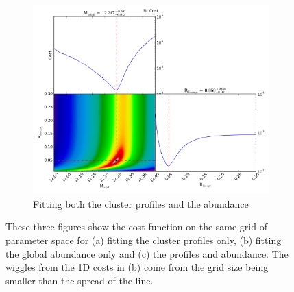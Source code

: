 \documentclass[twocolumn]{article}
\begin{document}
\begin{figure}
  \begin{subfigure}{.5\textwidth}
    \centering\includegraphics[width=1.0\linewidth]{figs/cfn/simet/simet_rd_abundance.param/calc_likelihood_bounds.py/fig2.png}
    \caption{Fitting both the cluster profiles and the abundance}
  \end{subfigure}
  \caption{ These three figures show the cost function on the same
    grid of parameter space for (a) fitting the cluster profiles only,
    (b) fitting the global abundance only and (c) the profiles and
    abundance. The wiggles from the 1D costs in (b) come from the grid
    size being smaller than the spread of the line. }
\end{figure}
  


  
\clearpage
\end{document}
